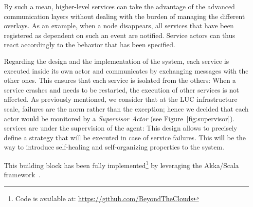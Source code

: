 By such a mean, higher-level services can take the advantage of the advanced
communication layers without dealing with the burden of managing the different
overlays. As an example, when a node disappears, all services that
have been registered as dependent on such an event are notified. 
Service actors can thus react accordingly to the behavior that has been specified. 
%
%
%
%

Regarding the design and the implementation of the \discovery system, each
service is executed inside its own actor and communicates by
exchanging messages with the other ones. This ensures that each
service is isolated from the others: When a service crashes and needs to be
restarted, the execution of other services is not affected. 
%
As previously mentioned, we consider that at the LUC infrastructure scale, failures are the norm
rather than the exception; hence we decided that each actor would be monitored
by a \emph{Supervisor Actor} (see Figure~\ref{fig:supervisor}). \discovery services are under the supervision of the \discovery agent: This design allows to precisely define a strategy
that will be executed in case of service failures. This will be the way to
introduce self-healing and self-organizing properties to the \discovery system.

This building block has been fully implemented\footnote{Code is available at:
\href{https://github.com/BeyondTheClouds}{\url{https://github.com/BeyondTheClouds}}} by 
leveraging the Akka/Scala framework~\cite{akka:www}.

